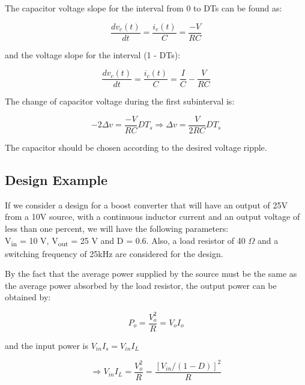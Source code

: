 The capacitor voltage slope for the interval from 0 to DTs can be found as:

\begin{equation}
	\frac{dv_c(t)}{dt} = \frac{i_c(t)}{C} = \frac{-V}{RC}
	\label{eq:CBC_CVR2}
\end{equation}

and the voltage slope for the interval (1 - DTs):

\begin{equation}
	\frac{dv_c(t)}{dt} = \frac{i_c(t)}{C} = \frac{I}{C} - \frac{V}{RC}
	\label{eq:CBC_CVR3}
\end{equation}

The change of capacitor voltage during the first subinterval is:

\begin{equation}
	-2\Delta v = \frac{-V}{RC}DT_s \Rightarrow
  \Delta v = \frac{V}{2RC}DT_s
	\label{eq:CBC_CVR4}
\end{equation}

The capacitor should be chosen according to the desired voltage ripple.

\subsection{Design Example}\label{sec:CBC_DE}

If we consider a design for a boost converter that will have an output of 25V from a 10V source, with a continuous inductor current and an output voltage of less than one percent, we will have the following parameters:\\
V\textsubscript{in} = 10 V, V\textsubscript{out} = 25 V and D = 0.6. Also,
a load resistor of 40 $\Omega$ and a  switching frequency of 25kHz are considered for the design.


By the fact that the average power supplied by the source must be the same as the average power absorbed by the load resistor, the output power can be obtained by:

\begin{equation}
	P_o = \frac{V^2_o}{R} = V_oI_o
	\label{eq:CBC_CVR4}
\end{equation}

and the input power is $V_{in}I_s = V_{in}I_L$

\begin{equation}
	\Rightarrow V_{in}I_L = \frac{V^2_o}{R} = \frac{[V_{in}/(1-D)]^2}{R}
	\label{eq:CBC_CVR4}
\end{equation}

